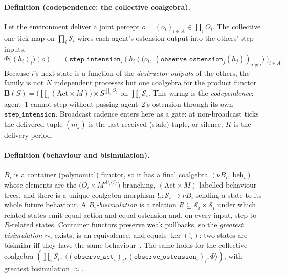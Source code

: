 \documentclass{article}
\newcommand{\method}[1]{\texttt{#1}}
\begin{document}
\paragraph{Definition (codependence: the collective coalgebra).}
Let the environment deliver a joint percept $o=(o_i)_{i\in A}\in\prod_i O_i$.
The collective one-tick map on $\prod_i\mathcal{S}_i$ wires each agent's
ostension output into the others' step inputs,
\[
  \Phi\big((h_i)_i\big)(o)\;=\;
  \Big(\ \method{step\_intension}_i(h_i)\big(o_i,\,(\method{observe\_ostension}_j(h_j))_{j\neq i}\big)\ \Big)_{i\in A}.
\]
Because $i$'s next state is a function of the \emph{destructor outputs} of
the others, the family is not $N$ independent processes but one coalgebra for
the product functor $\mathbf{B}(S)=\big(\prod_i(\mathrm{Act}\times M)\big)\times S^{\prod_i O_i}$
on $\prod_i\mathcal{S}_i$. This wiring is the \emph{codependence}: agent~1
cannot step without passing agent~2's ostension through its own
$\method{step\_intension}$. Broadcast cadence enters here as a gate: at
non-broadcast ticks the delivered tuple $(m_j)$ is the last received (stale)
tuple, or silence; $K$ is the delivery period.

\paragraph{Definition (behaviour and bisimulation).}
$B_i$ is a container (polynomial) functor, so it has a final coalgebra
$(\nu B_i,\ \mathrm{beh}_i)$~\citep{aczel1988nonwellfounded,rutten2000universal} whose elements are the $\big(O_i\times M^{A\setminus\{i\}}\big)$-branching,
$(\mathrm{Act}\times M)$-labelled behaviour trees, and there is a unique
coalgebra morphism $!_i:\mathcal{S}_i\to\nu B_i$ sending a state to its whole
future behaviour. A \emph{$B_i$-bisimulation} is a relation
$R\subseteq\mathcal{S}_i\times\mathcal{S}_i$ under which related states emit
equal action and equal ostension and, on every input, step to $R$-related
states. Container functors preserve weak pullbacks, so the \emph{greatest
bisimulation} $\sim_i$ exists, is an equivalence, and equals $\ker(!_i)$:
two states are bisimilar iff they have the same behaviour~\citep{sangiorgi2011bisimulation}. The same holds for
the collective coalgebra $(\prod_i\mathcal{S}_i,\ \langle(\method{observe\_act}_i)_i,(\method{observe\_ostension}_i)_i,\Phi\rangle)$,
with greatest bisimulation $\approx$.
\end{document}

